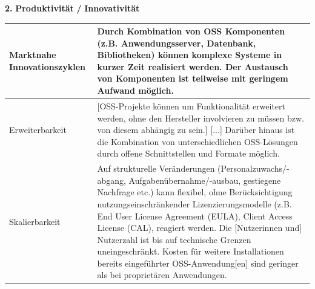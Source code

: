 \documentclass[a4paper]{article}
\newcommand\textstyleACRONYM[1]{#1}
\begin{document}
\bigskip


\bigskip


\bigskip

{
\textbf{2.}\textbf{ }\textbf{Produktivit\"at}\textbf{
}\textbf{/}\textbf{ }\textbf{Innovativit\"at}}


\bigskip

\begin{flushleft}
\tablehead{}
\begin{supertabular}{|m{1.8900598in}m{4.77126in}|}
\hline
{} Marktnahe Innovationszyklen &
 Durch Kombination von \textstyleACRONYM{OSS}
Komponenten (\textstyleACRONYM{z.B.} Anwendungsserver, Datenbank,
Bibliotheken) k\"onnen komplexe Systeme in kurzer Zeit realisiert
werden. Der Austausch von Komponenten ist teilweise mit geringem
Aufwand m\"oglich.\\\hline
{} Erweiterbarkeit &
\textstyleACRONYM{[OSS-Projekte}\textstyleACRONYM{
}\textstyleACRONYM{k\"onnen}\textstyleACRONYM{
}\textstyleACRONYM{um}\textstyleACRONYM{
}\textstyleACRONYM{Funktionalit\"at}\textstyleACRONYM{
}\textstyleACRONYM{erweitert}\textstyleACRONYM{
}\textstyleACRONYM{werden,}\textstyleACRONYM{
}\textstyleACRONYM{ohne}\textstyleACRONYM{
}\textstyleACRONYM{den}\textstyleACRONYM{
}\textstyleACRONYM{Hersteller}\textstyleACRONYM{
}\textstyleACRONYM{involvieren}\textstyleACRONYM{
}\textstyleACRONYM{zu}\textstyleACRONYM{
}\textstyleACRONYM{m\"ussen}\textstyleACRONYM{
}\textstyleACRONYM{bzw.}\textstyleACRONYM{
}\textstyleACRONYM{von}\textstyleACRONYM{
}\textstyleACRONYM{diesem}\textstyleACRONYM{
}\textstyleACRONYM{abh\"angig}\textstyleACRONYM{
}\textstyleACRONYM{zu}\textstyleACRONYM{
}\textstyleACRONYM{sein.]}\textstyleACRONYM{
}\textstyleACRONYM{[...]}\textstyleACRONYM{ }Dar\"uber hinaus ist die
Kombination von unterschiedlichen \textstyleACRONYM{OSS}{}-L\"osungen
durch offene Schnittstellen und Formate m\"oglich.\\\hline
{} Skalierbarkeit &
 Auf strukturelle Ver\"anderungen
(Personalzuwachs/-abgang, Aufgaben\"ubernahme/-ausbau, gestiegene
Nachfrage \textstyleACRONYM{etc.}) kann flexibel, ohne
Ber\"ucksichtigung nutzungseinschr\"ankender Lizenzierungsmodelle
(\textstyleACRONYM{z.B.} End User License Agreement
(\textstyleACRONYM{EULA}), Client Access License
(\textstyleACRONYM{CAL}), reagiert werden. Die [Nutzerinnen und]
Nutzerzahl ist bis auf technische Grenzen uneingeschr\"ankt. Kosten
f\"ur weitere Installationen bereits eingef\"uhrter
\textstyleACRONYM{OSS}{}-Anwendung[en] sind geringer als bei
propriet\"aren Anwendungen.\\\hline
\end{supertabular}
\end{flushleft}
\end{document}
